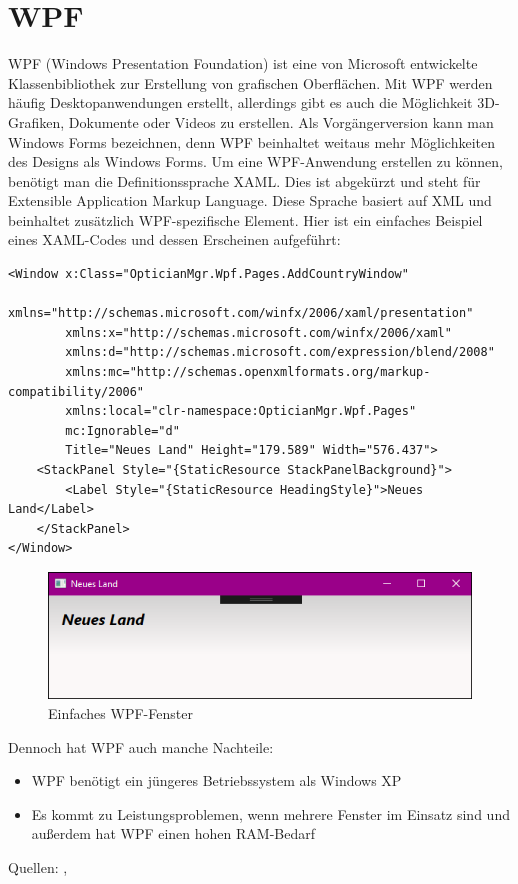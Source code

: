 \section{WPF}
WPF (Windows Presentation Foundation) ist eine von Microsoft entwickelte Klassenbibliothek zur Erstellung von grafischen Oberflächen. Mit WPF werden häufig Desktopanwendungen erstellt, allerdings gibt es auch die Möglichkeit 3D-Grafiken, Dokumente oder Videos zu erstellen. Als Vorgängerversion kann man Windows Forms bezeichnen, denn WPF beinhaltet weitaus mehr Möglichkeiten des Designs als Windows Forms.
Um eine WPF-Anwendung erstellen zu können, benötigt man die Definitionssprache XAML. Dies ist abgekürzt und steht für Extensible Application Markup Language. Diese Sprache basiert auf XML und beinhaltet zusätzlich WPF-spezifische Element. Hier ist ein einfaches Beispiel eines XAML-Codes und dessen Erscheinen aufgeführt: 
\begin{lstlisting}
<Window x:Class="OpticianMgr.Wpf.Pages.AddCountryWindow"
        xmlns="http://schemas.microsoft.com/winfx/2006/xaml/presentation"
        xmlns:x="http://schemas.microsoft.com/winfx/2006/xaml"
        xmlns:d="http://schemas.microsoft.com/expression/blend/2008"
        xmlns:mc="http://schemas.openxmlformats.org/markup-compatibility/2006"
        xmlns:local="clr-namespace:OpticianMgr.Wpf.Pages"
        mc:Ignorable="d"
        Title="Neues Land" Height="179.589" Width="576.437">
    <StackPanel Style="{StaticResource StackPanelBackground}">
        <Label Style="{StaticResource HeadingStyle}">Neues Land</Label>
    </StackPanel>
</Window>
\end{lstlisting}
\begin{figure}[H]
\begin{center}
	\includegraphics[scale=.7]{images/Wpf.png}
\end{center}
	\caption{Einfaches WPF-Fenster}
	\label{fig:sample}
\end{figure}
Dennoch hat WPF auch manche Nachteile:
\begin{itemize}
\item WPF benötigt ein jüngeres Betriebssystem als Windows XP
\item Es kommt zu Leistungsproblemen, wenn mehrere Fenster im Einsatz sind und außerdem hat WPF einen hohen RAM-Bedarf
\end{itemize}
Quellen: \cite{it-visions_was_2018}, \cite{schwichtenberg_vor-_2018}
